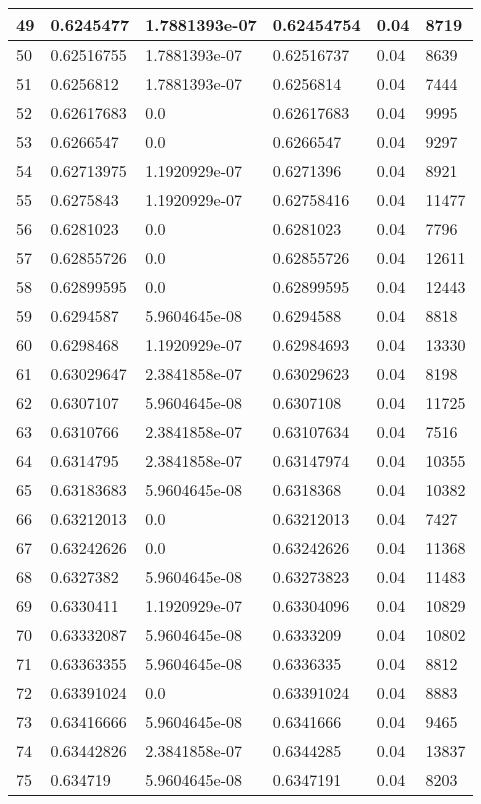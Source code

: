 \begin{longtable}{|l|l|l|l|l|l|}
49 & 0.6245477 & 1.7881393e-07 & 0.62454754 & 0.04 & 8719 \\ \hline 
50 & 0.62516755 & 1.7881393e-07 & 0.62516737 & 0.04 & 8639 \\ \hline 
51 & 0.6256812 & 1.7881393e-07 & 0.6256814 & 0.04 & 7444 \\ \hline 
52 & 0.62617683 & 0.0 & 0.62617683 & 0.04 & 9995 \\ \hline 
53 & 0.6266547 & 0.0 & 0.6266547 & 0.04 & 9297 \\ \hline 
54 & 0.62713975 & 1.1920929e-07 & 0.6271396 & 0.04 & 8921 \\ \hline 
55 & 0.6275843 & 1.1920929e-07 & 0.62758416 & 0.04 & 11477 \\ \hline 
56 & 0.6281023 & 0.0 & 0.6281023 & 0.04 & 7796 \\ \hline 
57 & 0.62855726 & 0.0 & 0.62855726 & 0.04 & 12611 \\ \hline 
58 & 0.62899595 & 0.0 & 0.62899595 & 0.04 & 12443 \\ \hline 
59 & 0.6294587 & 5.9604645e-08 & 0.6294588 & 0.04 & 8818 \\ \hline 
60 & 0.6298468 & 1.1920929e-07 & 0.62984693 & 0.04 & 13330 \\ \hline 
61 & 0.63029647 & 2.3841858e-07 & 0.63029623 & 0.04 & 8198 \\ \hline 
62 & 0.6307107 & 5.9604645e-08 & 0.6307108 & 0.04 & 11725 \\ \hline 
63 & 0.6310766 & 2.3841858e-07 & 0.63107634 & 0.04 & 7516 \\ \hline 
64 & 0.6314795 & 2.3841858e-07 & 0.63147974 & 0.04 & 10355 \\ \hline 
65 & 0.63183683 & 5.9604645e-08 & 0.6318368 & 0.04 & 10382 \\ \hline 
66 & 0.63212013 & 0.0 & 0.63212013 & 0.04 & 7427 \\ \hline 
67 & 0.63242626 & 0.0 & 0.63242626 & 0.04 & 11368 \\ \hline 
68 & 0.6327382 & 5.9604645e-08 & 0.63273823 & 0.04 & 11483 \\ \hline 
69 & 0.6330411 & 1.1920929e-07 & 0.63304096 & 0.04 & 10829 \\ \hline 
70 & 0.63332087 & 5.9604645e-08 & 0.6333209 & 0.04 & 10802 \\ \hline 
71 & 0.63363355 & 5.9604645e-08 & 0.6336335 & 0.04 & 8812 \\ \hline 
72 & 0.63391024 & 0.0 & 0.63391024 & 0.04 & 8883 \\ \hline 
73 & 0.63416666 & 5.9604645e-08 & 0.6341666 & 0.04 & 9465 \\ \hline 
74 & 0.63442826 & 2.3841858e-07 & 0.6344285 & 0.04 & 13837 \\ \hline 
75 & 0.634719 & 5.9604645e-08 & 0.6347191 & 0.04 & 8203 \\ \hline 
\end{longtable}